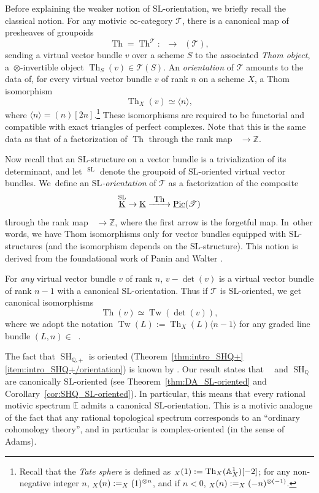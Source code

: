 \documentclass[11pt]{article}
\makeatletter
\numberwithin{equation}{section}\renewcommand{\encodingdefault}{TU}
\def\To#1{\mathchoice{\xrightarrow{\textstyle\kern4pt#1\kern3pt}}{\stackrel{#1}{\longrightarrow}}{}{}}
\DeclareRobustCommand{\mathbbm}[1]{\csname jepbb@#1\endcsname}
\newcommand{\T}{\mathscr T}
\DeclareMathOperator{\uK}{\underline K}
\DeclareMathOperator{\uPic}{\underline{Pic}}
\renewcommand{\AA}{\mathbb A}
\newcommand{\E}{\mathbb E}
\newcommand{\un}{\mathbbm 1}
\newcommand{\SL}{\mathrm{SL}}
\DeclareMathOperator{\SH}{SH}
\DeclareMathOperator{\DAminus}{D_{\AA^1,-}}
\newcommand{\twist}[1]{\langle #1 \rangle}
\DeclareMathOperator{\Th}{Th}
\DeclareMathOperator{\Tw}{Tw}
\newcommand{\ZZ} {\mathbb Z}
\newcommand{\QQ} {\mathbb Q}
\theoremstyle{remark}
\theoremstyle{definition}
\numberwithin{equation}{thm}
\makeatother
\begin{document}
Before explaining the weaker notion of $\SL$-orientation, we briefly recall the classical notion.
For any motivic $\infty$-category $\T$, there is a canonical map of presheaves of groupoids
\[
\Th = \Th^\T : \uK \to \uPic(\T),
\]
sending a virtual vector bundle $v$ over a scheme $S$ to the associated \emph{Thom object}, a~$\otimes$-invertible object $\Th_S(v) \in \T(S)$.
An \emph{orientation} of $\T$ amounts to the data of, for every virtual vector bundle $v$ of rank $n$ on a scheme $X$, a Thom isomorphism
\[
\Th_X(v) \simeq \twist{n},
\]
where $\twist{n} = (n)[2n]$.\footnote{Recall that the \emph{Tate sphere} is defined as $\un_X(1):=\Th_X(\mathbb{A}^1_X)[-2]$; for any non-negative integer $n$, $\un_X(n):=\un_X(1)^{\otimes n}$, and if $n<0$, $\un_X(n):=\un_X(-n)^{\otimes (-1)}$.}
These isomorphisms are required to be functorial and compatible with exact triangles of perfect complexes.
Note that this is the same data as that of a factorization of $\Th$ through the rank map $\uK \to \ZZ$.

Now recall that an $\SL$-structure on a vector bundle is a trivialization of its deter\-mi\-nant, and let $\uK^\SL$ denote the groupoid of $\SL$-oriented virtual vector bundles.
We~define an \emph{$\SL$-orientation} of $\T$ as a factorization of the composite
\[
\uK^\SL \to \uK \To{\Th} \uPic(\T)
\]
through the rank map $\uK \to \ZZ$, where the first arrow is the forgetful map.
In~other words, we have Thom isomorphisms only for vector bundles equipped with $\SL$\nobreakdash-structures (and the isomorphism depends on the $\SL$-structure).
This notion is derived from the foundational work of Panin and Walter \cite{PaninWalter1}.

For \emph{any} virtual vector bundle $v$ of rank $n$, $v - \det(v)$ is a virtual vector bundle of rank $n-1$ with a canonical $\SL$-orientation.
Thus if $\T$ is $\SL$-oriented, we get canonical isomorphisms
\[
\Th(v) \simeq \Tw(\det(v)),
\]
where we adopt the notation $\Tw(L) := \Th_X(L)\twist{n-1}$ for any graded line bundle $(L, n) \in \uPic$.

The fact that $\SH_{\QQ,+}$ is oriented (Theorem~\ref{thm:intro_SHQ+}\eqref{item:intro_SHQ+/orientation}) is known by \cite[14.2.5 \& Th.\,16.2.13]{CD3}.
Our result states that $\DAminus$ and $\SH_\QQ$ are canonically $\SL$-oriented (see Theorem~\ref{thm:DA_SL-oriented} and Corollary~\ref{cor:SHQ_SL-oriented}).
In particular, this means that every rational motivic spectrum $\E$ admits a canonical $\SL$-orientation.
This is a motivic analogue of the fact that any rational topological spectrum corresponds to an ``ordinary cohomology theory'', and in particular is complex-oriented (in the sense of Adams).
\end{document}
